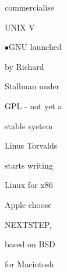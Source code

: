 \documentclass[a4paper,portrait,12pt]{article}
\begin{document}
\begin{flushleft}
commercialise
\end{flushleft}


\begin{flushleft}
UNIX V
\end{flushleft}


\begin{flushleft}
$\bullet$GNU launched
\end{flushleft}


\begin{flushleft}
by Richard
\end{flushleft}


\begin{flushleft}
Stallman under
\end{flushleft}


\begin{flushleft}
GPL - not yet a
\end{flushleft}


\begin{flushleft}
stable system
\end{flushleft}










\begin{flushleft}
Linus Torvalds
\end{flushleft}


\begin{flushleft}
starts writing
\end{flushleft}


\begin{flushleft}
Linux for x86
\end{flushleft}







\begin{flushleft}
Apple choose
\end{flushleft}


\begin{flushleft}
NEXTSTEP,
\end{flushleft}


\begin{flushleft}
based on BSD
\end{flushleft}


\begin{flushleft}
for Macintosh
\end{flushleft}
\end{document}
